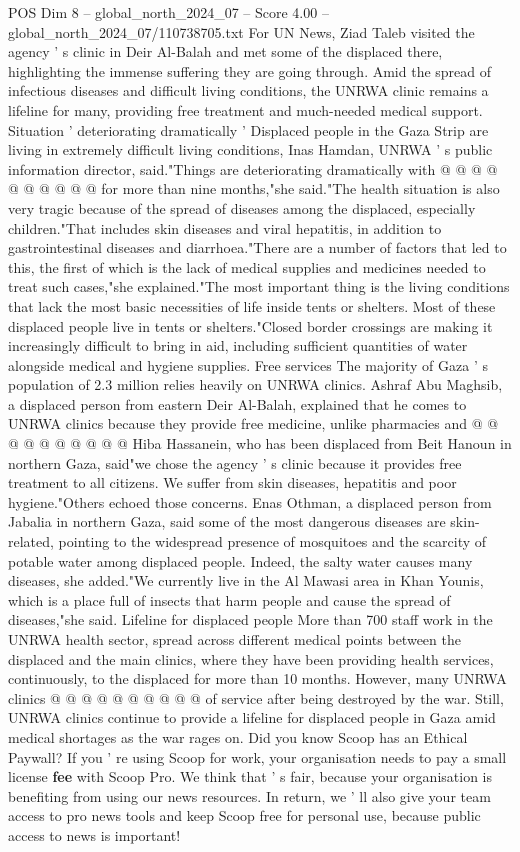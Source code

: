 \begin{textsample}{POS Dim 8 – global\_north\_2024\_07 – Score 4.00 – global\_north\_2024\_07/110738705.txt}
For UN News, Ziad Taleb visited the agency ' s clinic in Deir Al-Balah and met some of the displaced there, highlighting the immense suffering they are going through.
Amid the spread of infectious diseases and difficult living conditions, the UNRWA clinic remains a lifeline for many, providing free treatment and much-needed medical support.
Situation ' deteriorating dramatically ' Displaced people in the Gaza Strip are living in extremely difficult living conditions, Inas Hamdan, UNRWA ' s public information director, said."Things are deteriorating dramatically with @ @ @ @ @ @ @ @ @ @ for more than nine months,"she said."The health situation is also very tragic because of the spread of diseases among the displaced, especially children."That includes skin diseases and viral hepatitis, in addition to gastrointestinal diseases and diarrhoea."There are a number of factors that led to this, the first of which is the lack of medical supplies and medicines needed to treat such cases,"she explained."The most important thing is the living conditions that lack the most basic necessities of life inside tents or shelters.
Most of these displaced people live in tents or shelters."Closed border crossings are making it increasingly difficult to bring in aid, including sufficient quantities of water alongside medical and hygiene supplies.
Free services The majority of Gaza ' s population of 2.3 million relies heavily on UNRWA clinics.
Ashraf Abu Maghsib, a displaced person from eastern Deir Al-Balah, explained that he comes to UNRWA clinics because they provide free medicine, unlike pharmacies and @ @ @ @ @ @ @ @ @ @ Hiba Hassanein, who has been displaced from Beit Hanoun in northern Gaza, said"we chose the agency ' s clinic because it provides free treatment to all citizens.
We suffer from skin diseases, hepatitis and poor hygiene."Others echoed those concerns.
Enas Othman, a displaced person from Jabalia in northern Gaza, said some of the most dangerous diseases are skin-related, pointing to the widespread presence of mosquitoes and the scarcity of potable water among displaced people.
Indeed, the salty water causes many diseases, she added."We currently live in the Al Mawasi area in Khan Younis, which is a place full of insects that harm people and cause the spread of diseases,"she said.
Lifeline for displaced people More than 700 staff work in the UNRWA health sector, spread across different medical points between the displaced and the main clinics, where they have been providing health services, continuously, to the displaced for more than 10 months.
However, many UNRWA clinics @ @ @ @ @ @ @ @ @ @ of service after being destroyed by the war.
Still, UNRWA clinics continue to provide a lifeline for displaced people in Gaza amid medical shortages as the war rages on.
Did you know Scoop has an Ethical Paywall?
If you ' re using Scoop for work, your organisation needs to pay a small license \textbf{fee} with Scoop Pro.
We think that ' s fair, because your organisation is benefiting from using our news resources.
In return, we ' ll also give your team access to pro news tools and keep Scoop free for personal use, because public access to news is important!


\end{textsample}
